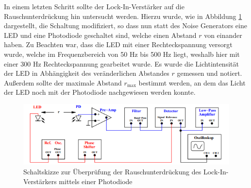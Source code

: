 In einem letzten Schritt sollte der Lock-In-Verstärker auf die Rauschunterdrückung hin untersucht werden.
Hierzu wurde, wie in Abbildung \ref{fig:aufbau2} dargestellt, die Schaltung modifiziert, so dass nun statt des Noise Generators eine LED und eine Photodiode geschaltet sind, welche einen Abstand $r$ von einander haben.
Zu Beachten war, dass die LED mit einer Rechteckspannung versorgt wurde, welche im Frequenzbereich von 50 Hz bis 500 Hz
liegt, weshalb hier mit einer 300 Hz Rechteckspannung gearbeitet wurde. Es wurde die Lichtintensität der LED in Abhängigkeit des veränderlichen Abstandes $r$ gemessen und notiert. Außerdem sollte der maximale Abstand 
$r_\text{max}$ bestimmt werden, an dem das Licht der LED noch mit der Photodiode nachgewiesen werden konnte.
\begin{figure}
  \centering
  \includegraphics{content/abbildung3.png}
  \caption{Schaltskizze zur Überprüfung der Rauschunterdrückung des Lock-In-Verstärkers mittels einer Photodiode \cite[5]{V303}}
  \label{fig:aufbau2}
\end{figure}